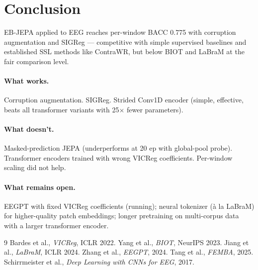 \documentclass[10pt,a4paper]{article}
\begin{document}
\section{Conclusion}
EB-JEPA applied to EEG reaches per-window BACC 0.775 with corruption augmentation and SIGReg
— competitive with simple supervised baselines and established SSL methods like ContraWR,
but below BIOT and LaBraM at the fair comparison level.

\paragraph{What works.} Corruption augmentation. SIGReg. Strided Conv1D encoder (simple,
effective, beats all transformer variants with 25$\times$ fewer parameters).

\paragraph{What doesn't.} Masked-prediction JEPA (underperforms at 20 ep with global-pool probe).
Transformer encoders trained with wrong VICReg coefficients. Per-window scaling did not help.

\paragraph{What remains open.} EEGPT with fixed VICReg coefficients (running); neural tokenizer
(à la LaBraM) for higher-quality patch embeddings; longer pretraining on multi-corpus data with
a larger transformer encoder.

%
%
\begin{thebibliography}{9}
 Bardes et al., \emph{VICReg}, ICLR 2022.
 Yang et al., \emph{BIOT}, NeurIPS 2023.
 Jiang et al., \emph{LaBraM}, ICLR 2024.
 Zhang et al., \emph{EEGPT}, 2024.
 Tang et al., \emph{FEMBA}, 2025.
 Schirrmeister et al., \emph{Deep Learning with CNNs for EEG}, 2017.
\end{thebibliography}
\end{document}
